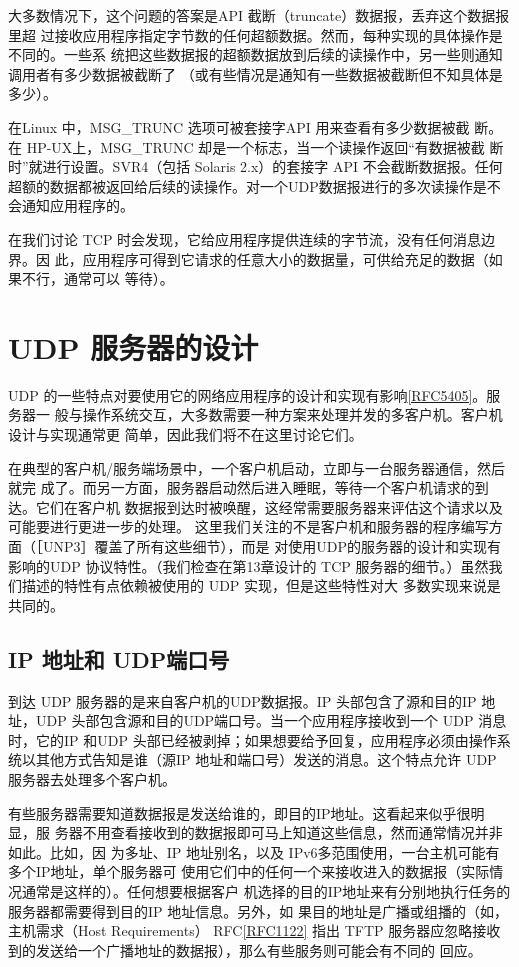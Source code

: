 大多数情况下，这个问题的答案是API 截断（truncate）数据报，丢弃这个数据报里超
过接收应用程序指定字节数的任何超额数据。然而，每种实现的具体操作是不同的。一些系
统把这些数据报的超额数据放到后续的读操作中，另一些则通知调用者有多少数据被截断了
（或有些情况是通知有一些数据被截断但不知具体是多少）。

\begin{tcolorbox}    
    在Linux 中，MSG\_TRUNC 选项可被套接字API 用来查看有多少数据被截
    断。在 HP-UX上，MSG\_TRUNC 却是一个标志，当一个读操作返回“有数据被截
    断时”就进行设置。SVR4（包括 Solaris 2.x）的套接字 API 不会截断数据报。任何
    超额的数据都被返回给后续的读操作。对一个UDP数据报进行的多次读操作是不
    会通知应用程序的。
\end{tcolorbox}

在我们讨论 TCP 时会发现，它给应用程序提供连续的字节流，没有任何消息边界。因
此，应用程序可得到它请求的任意大小的数据量，可供给充足的数据（如果不行，通常可以
等待）。

\section{UDP 服务器的设计}
UDP 的一些特点对要使用它的网络应用程序的设计和实现有影响\href{https://www.rfc-editor.org/rfc/rfc5405}{[RFC5405]}。服务器一
般与操作系统交互，大多数需要一种方案来处理并发的多客户机。客户机设计与实现通常更
简单，因此我们将不在这里讨论它们。

在典型的客户机/服务端场景中，一个客户机启动，立即与一台服务器通信，然后就完
成了。而另一方面，服务器启动然后进入睡眠，等待一个客户机请求的到达。它们在客户机
数据报到达时被唤醒，这经常需要服务器来评估这个请求以及可能要进行更进一步的处理。
这里我们关注的不是客户机和服务器的程序编写方面（［UNP3］覆盖了所有这些细节），而是
对使用UDP的服务器的设计和实现有影响的UDP 协议特性。（我们检查在第13章设计的
TCP 服务器的细节。）虽然我们描述的特性有点依赖被使用的 UDP 实现，但是这些特性对大
多数实现来说是共同的。

\subsection{IP 地址和 UDP端口号}
到达 UDP 服务器的是来自客户机的UDP数据报。IP 头部包含了源和目的IP 地址，UDP
头部包含源和目的UDP端口号。当一个应用程序接收到一个 UDP 消息时，它的IP 和UDP
头部已经被剥掉；如果想要给予回复，应用程序必须由操作系统以其他方式告知是谁（源IP
地址和端口号）发送的消息。这个特点允许 UDP 服务器去处理多个客户机。

有些服务器需要知道数据报是发送给谁的，即目的IP地址。这看起来似乎很明显，服
务器不用查看接收到的数据报即可马上知道这些信息，然而通常情况并非如此。比如，因
为多址、IP 地址别名，以及 IPv6多范围使用，一台主机可能有多个IP地址，单个服务器可
使用它们中的任何一个来接收进入的数据报（实际情况通常是这样的）。任何想要根据客户
机选择的目的IP地址来有分别地执行任务的服务器都需要得到目的IP 地址信息。另外，如
果目的地址是广播或组播的（如，主机需求（Host Requirements） RFC\href{https://www.rfc-editor.org/rfc/rfc1122}{[RFC1122]} 指出 TFTP
服务器应忽略接收到的发送给一个广播地址的数据报），那么有些服务则可能会有不同的
回应。

